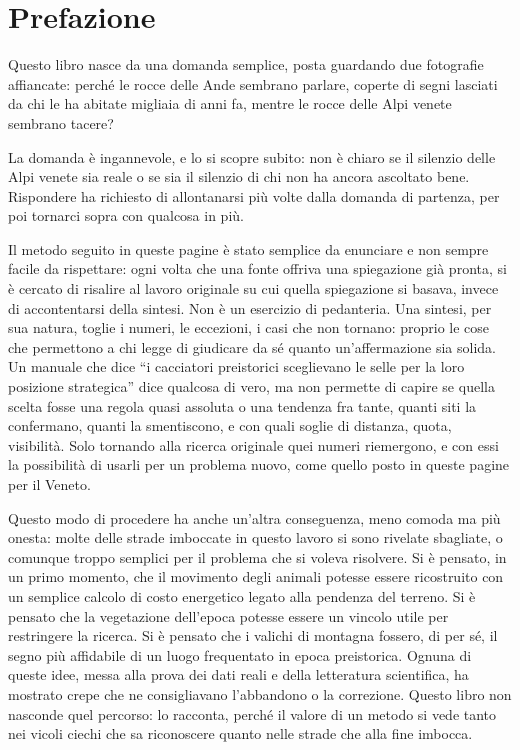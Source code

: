 \chapter*{Prefazione}

Questo libro nasce da una domanda semplice, posta guardando due fotografie affiancate: perché le rocce delle Ande sembrano parlare, coperte di segni lasciati da chi le ha abitate migliaia di anni fa, mentre le rocce delle Alpi venete sembrano tacere?

La domanda è ingannevole, e lo si scopre subito: non è chiaro se il silenzio delle Alpi venete sia reale o se sia il silenzio di chi non ha ancora ascoltato bene. Rispondere ha richiesto di allontanarsi più volte dalla domanda di partenza, per poi tornarci sopra con qualcosa in più.

Il metodo seguito in queste pagine è stato semplice da enunciare e non sempre facile da rispettare: ogni volta che una fonte offriva una spiegazione già pronta, si è cercato di risalire al lavoro originale su cui quella spiegazione si basava, invece di accontentarsi della sintesi. Non è un esercizio di pedanteria. Una sintesi, per sua natura, toglie i numeri, le eccezioni, i casi che non tornano: proprio le cose che permettono a chi legge di giudicare da sé quanto un'affermazione sia solida. Un manuale che dice ``i cacciatori preistorici sceglievano le selle per la loro posizione strategica'' dice qualcosa di vero, ma non permette di capire se quella scelta fosse una regola quasi assoluta o una tendenza fra tante, quanti siti la confermano, quanti la smentiscono, e con quali soglie di distanza, quota, visibilità. Solo tornando alla ricerca originale quei numeri riemergono, e con essi la possibilità di usarli per un problema nuovo, come quello posto in queste pagine per il Veneto.

Questo modo di procedere ha anche un'altra conseguenza, meno comoda ma più onesta: molte delle strade imboccate in questo lavoro si sono rivelate sbagliate, o comunque troppo semplici per il problema che si voleva risolvere. Si è pensato, in un primo momento, che il movimento degli animali potesse essere ricostruito con un semplice calcolo di costo energetico legato alla pendenza del terreno. Si è pensato che la vegetazione dell'epoca potesse essere un vincolo utile per restringere la ricerca. Si è pensato che i valichi di montagna fossero, di per sé, il segno più affidabile di un luogo frequentato in epoca preistorica. Ognuna di queste idee, messa alla prova dei dati reali e della letteratura scientifica, ha mostrato crepe che ne consigliavano l'abbandono o la correzione. Questo libro non nasconde quel percorso: lo racconta, perché il valore di un metodo si vede tanto nei vicoli ciechi che sa riconoscere quanto nelle strade che alla fine imbocca.

